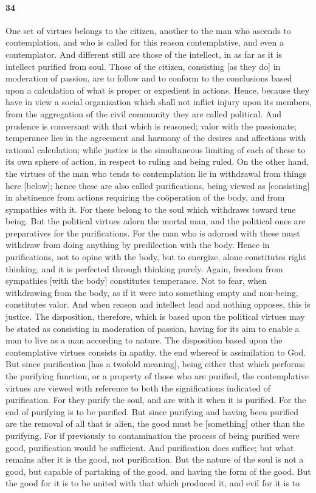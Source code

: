 \documentclass{article}
\begin{document}
\paragraph{34} One set of virtues belongs to the citizen, another to the man who ascends to contemplation, and who is called for this reason contemplative, and even a contemplator. And different still are those of the intellect, in as far as it is intellect purified from soul. Those of the citizen, consisting [as they do] in moderation of passion, are to follow and to conform to the conclusions based upon a calculation of what is proper or expedient in actions. Hence, because they have in view a social organization which shall not inflict injury upon its members, from the aggregation of the civil community they are called political. And prudence is conversant with that which is reasoned; valor with the passionate; temperance lies in the agreement and harmony of the desires and affections with rational calculation; while justice is the simultaneous limiting of each of these to its own sphere of action, in respect to ruling and being ruled. On the other hand, the virtues of the man who tends to contemplation lie in withdrawal from things here [below]; hence these are also called purifications, being viewed as [consisting] in abstinence from actions requiring the co\"{o}peration of the body, and from sympathies with it. For these belong to the soul which withdraws toward true being. But the political virtues adorn the mortal man, and the political ones are preparatives for the purifications. For the man who is adorned with these must withdraw from doing anything by predilection with the body. Hence in purifications, not to opine with the body, but to energize, alone constitutes right thinking, and it is perfected through thinking purely. Again, freedom from sympathies [with the body] constitutes temperance. Not to fear, when withdrawing from the body, as if it were into something empty and non-being, constitutes valor. And when reason and intellect lead and nothing opposes, this is justice. The disposition, therefore, which is based upon the political virtues may be stated as consisting in moderation of passion, having for its aim to enable a man to live as a man according to nature. The disposition based upon the contemplative virtues consists in apathy, the end whereof is assimilation to God. But since purification [has a twofold meaning], being either that which performs the purifying function, or a property of those who are purified, the contemplative virtues are viewed with reference to both the significations indicated of purification. For they purify the soul, and are with it when it is purified. For the end of purifying is to be purified. But since purifying and having been purified are the removal of all that is alien, the good must be [something] other than the purifying. For if previously to contamination the process of being purified were good, purification would be sufficient. And purification does suffice; but what remains after it is the good, not purification. But the nature of the soul is not a good, but capable of partaking of the good, and having the form of the good. But the good for it is to be united with that which produced it, and evil for it is to 
\end{document}
